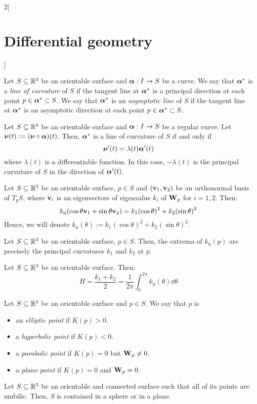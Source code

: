 \documentclass[../../../main.tex]{subfiles}
\begin{document}
\begin{multicols}{2}[\section{Differential geometry}]
  \begin{definition}
    Let $S\subseteq\mathbb{R}^3$ be an orientable surface and $\boldsymbol{\mathrm{\alpha}}:I\rightarrow S$ be a curve. We say that $\boldsymbol{\mathrm{\alpha}}^*$ is a \emph{line of curvature} of $S$ if the tangent line at $\boldsymbol{\mathrm{\alpha}}^*$ is a principal direction at each point $p\in\boldsymbol{\mathrm{\alpha}}^*\subset S$. We say that $\boldsymbol{\mathrm{\alpha}}^*$ is an \emph{asymptotic line} of $S$ if the tangent line at $\boldsymbol{\mathrm{\alpha}}^*$ is an asymptotic direction at each point $p\in\boldsymbol{\mathrm{\alpha}}^*\subset S$.
  \end{definition}
  \begin{proposition}
    Let $S\subseteq\mathbb{R}^3$ be an orientable surface and $\boldsymbol{\mathrm{\alpha}}:I\rightarrow S$ be a regular curve. Let $\boldsymbol{\mathrm{\nu}}(t):=(\boldsymbol{\mathrm{\nu}}\circ\boldsymbol{\mathrm{\alpha}})(t)$. Then, $\boldsymbol{\mathrm{\alpha}}^*$ is a line of curvature of $S$ if and only if $$\boldsymbol{\mathrm{\nu}}'(t)=\lambda(t)\boldsymbol{\mathrm{\alpha}}'(t)$$ where $\lambda(t)$ is a differentiable function. In this case, $-\lambda(t)$ is the principal curvature of $S$ in the direction of $\boldsymbol{\mathrm{\alpha}}'(t)$.
  \end{proposition}
  \begin{proposition}
    Let $S\subseteq\mathbb{R}^3$ be an orientable surface, $p\in S$ and $(\boldsymbol{\mathrm{v}}_1,\boldsymbol{\mathrm{v}}_2)$ be an orthonormal basis of $T_pS$, where $\boldsymbol{\mathrm{v}}_i$ is an eigenvectors of eigenvalue $k_i$ of $\boldsymbol{\mathrm{W}}_p$ for $i=1,2$. Then: $$k_\text{n}(\cos\theta \boldsymbol{\mathrm{v}}_1+\sin\theta \boldsymbol{\mathrm{v}}_2)=k_1{\left(\cos\theta\right)}^2+k_2{\left(\sin\theta\right)}^2$$
    Hence, we will denote $k_\text{n}(\theta):=k_1{\left(\cos\theta\right)}^2+k_2{\left(\sin\theta\right)}^2$.
  \end{proposition}
  \begin{corollary}
    Let $S\subseteq\mathbb{R}^3$ be an orientable surface, $p\in S$. Then, the extrema of $k_\text{n}(p)$ are precisely the principal curvatures $k_1$ and $k_2$ at $p$.
  \end{corollary}
  \begin{proposition}
    Let $S\subseteq\mathbb{R}^3$ be an orientable surface. Then: $$H=\frac{k_1+k_2}{2}=\frac{1}{2\pi}\int_0^{2\pi}k_\text{n}(\theta)\dd\theta$$
  \end{proposition}
  \begin{definition}
    Let $S\subseteq\mathbb{R}^3$ be an orientable surface and $p\in S$. We say that $p$ is
    \begin{itemize}
      \item an \emph{elliptic point} if $K(p)>0$.
      \item a \emph{hyperbolic point} if $K(p)<0$.
      \item a \emph{parabolic point} if $K(p)=0$ but $\boldsymbol{\mathrm{W}}_p\ne0$.
      \item a \emph{plane point} if $K(p)=0$ and $\boldsymbol{\mathrm{W}}_p=0$.
    \end{itemize}
  \end{definition}
  \begin{proposition}
    Let $S\subseteq\mathbb{R}^3$ be an orientable and connected surface such that all of its points are umbilic. Then, $S$ is contained in a sphere or in a plane.
  \end{proposition}

\end{multicols}
\end{document}
